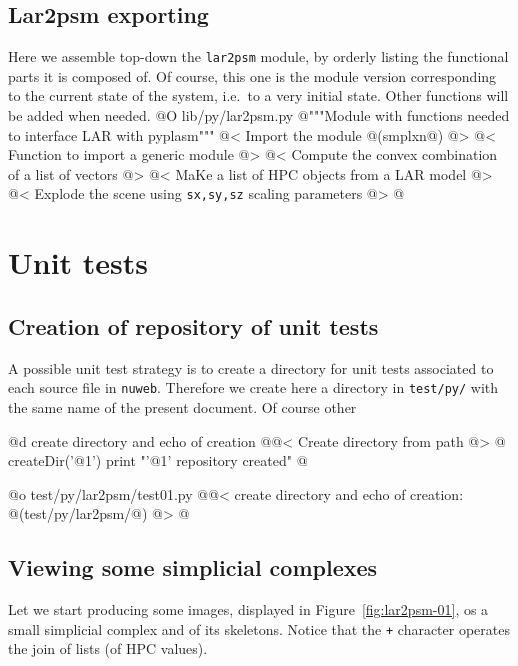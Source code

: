 \documentclass[11pt,oneside]{article}	%
\begin{document}
\subsection{Lar2psm exporting}
\label{sec:lar2psm}
Here we assemble top-down the \texttt{lar2psm} module, by orderly listing the functional parts it is composed of. Of course, this one is the module version corresponding to the current state of the system, i.e.~to a very initial state. Other functions will be added when needed.
@O lib/py/lar2psm.py
@{"""Module with functions needed to interface LAR with pyplasm"""
@< Import the module @(smplxn@) @>
@< Function to import a generic module @>
@< Compute the convex combination of a list of vectors @>
@< MaKe a list of HPC objects from a LAR model @>
@< Explode the scene using \texttt{sx,sy,sz} scaling parameters @>
@}



\section{Unit tests}


\subsection{Creation of repository of unit tests}

A possible unit test strategy is to create a directory for unit tests associated to each source file in \texttt{nuweb}. Therefore we create here a directory in \texttt{test/py/} with the same name of the present document. Of course other 

@d create directory and echo of creation
@{@< Create directory from path @>
@%
createDir('@1')
print "'@1' repository created"
@}

@o test/py/lar2psm/test01.py
@{@< create directory  and echo of creation: @(test/py/lar2psm/@) @>
@}


\subsection{Viewing some simplicial complexes}
Let we start producing some images, displayed in Figure~\ref{fig:lar2psm-01}, os a small simplicial complex and of its skeletons. Notice that the \texttt{+} character operates the join of lists (of HPC values).
\end{document}
